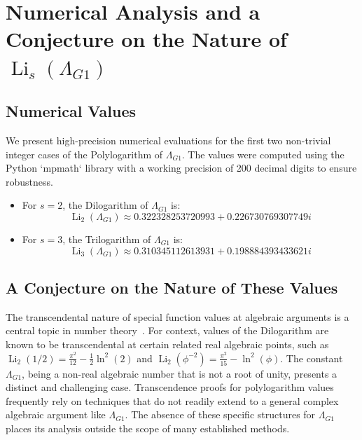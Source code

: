 \documentclass{amsart}
\theoremstyle{plain}
\theoremstyle{definition}
\theoremstyle{remark}
\DeclareMathOperator{\Li}{Li} %
\newcommand{\LambdaG}{\Lambda_{G1}}
\newcommand{\phiG}{\phi}
\begin{document}
\section{Numerical Analysis and a Conjecture on the Nature of \texorpdfstring{$\Li_s(\LambdaG)$}{Li\_s(Lambda\_G1)}}

\subsection{Numerical Values}
We present high-precision numerical evaluations for the first two non-trivial integer cases of the Polylogarithm of $\LambdaG$. The values were computed using the Python `mpmath` library with a working precision of 200 decimal digits to ensure robustness.
\begin{itemize}
    \item For $s=2$, the Dilogarithm of $\LambdaG$ is:
    \[ \Li_2(\LambdaG) \approx 0.322328253720993 + 0.226730769307749i \]
    
    \item For $s=3$, the Trilogarithm of $\LambdaG$ is:
    \[ \Li_3(\LambdaG) \approx 0.310345112613931 + 0.198884393433621i \]
    
\end{itemize}

\subsection{A Conjecture on the Nature of These Values}
The transcendental nature of special function values at algebraic arguments is a central topic in number theory~\cite{Baker}. For context, values of the Dilogarithm are known to be transcendental at certain related real algebraic points, such as $\Li_2(1/2) = \frac{\pi^2}{12} - \frac{1}{2}\ln^2(2)$ and $\Li_2(\phiG^{-2}) = \frac{\pi^2}{15} - \ln^2(\phiG)$. The constant $\LambdaG$, being a non-real algebraic number that is not a root of unity, presents a distinct and challenging case. Transcendence proofs for polylogarithm values frequently rely on techniques that do not readily extend to a general complex algebraic argument like $\LambdaG$. The absence of these specific structures for $\LambdaG$ places its analysis outside the scope of many established methods.
\end{document}
